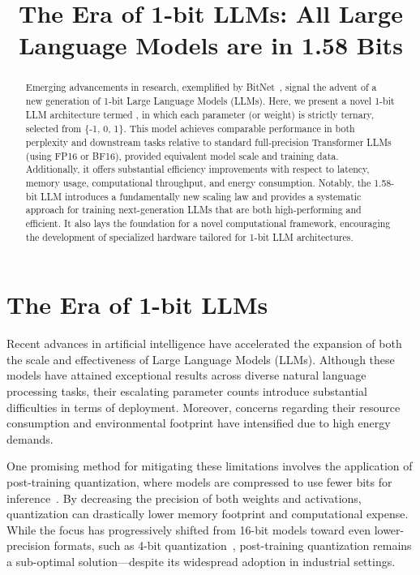 \title{The Era of 1-bit LLMs: All Large Language Models are in 1.58 Bits}

\begin{abstract}
Emerging advancements in research, exemplified by BitNet~\cite{bitnet}, signal the advent of a new generation of 1-bit Large Language Models (LLMs). Here, we present a novel 1-bit LLM architecture termed \textbf{}, in which each parameter (or weight) is strictly ternary, selected from \{-1, 0, 1\}. This model achieves comparable performance in both perplexity and downstream tasks relative to standard full-precision Transformer LLMs (using FP16 or BF16), provided equivalent model scale and training data. Additionally, it offers substantial efficiency improvements with respect to latency, memory usage, computational throughput, and energy consumption. Notably, the 1.58-bit LLM introduces a fundamentally new scaling law and provides a systematic approach for training next-generation LLMs that are both high-performing and efficient. It also lays the foundation for a novel computational framework, encouraging the development of specialized hardware tailored for 1-bit LLM architectures.
\end{abstract}

\section{The Era of 1-bit LLMs}

Recent advances in artificial intelligence have accelerated the expansion of both the scale and effectiveness of Large Language Models (LLMs). Although these models have attained exceptional results across diverse natural language processing tasks, their escalating parameter counts introduce substantial difficulties in terms of deployment. Moreover, concerns regarding their resource consumption and environmental footprint have intensified due to high energy demands.

One promising method for mitigating these limitations involves the application of post-training quantization, where models are compressed to use fewer bits for inference~\cite{smoothquant, gptq, quip, quip_sharp}. By decreasing the precision of both weights and activations, quantization can drastically lower memory footprint and computational expense. While the focus has progressively shifted from 16-bit models toward even lower-precision formats, such as 4-bit quantization~\cite{gptq, awq}, post-training quantization remains a sub-optimal solution—despite its widespread adoption in industrial settings.


